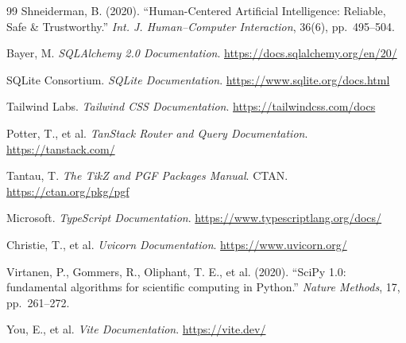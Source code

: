 \documentclass[11pt,a4paper]{article}
\begin{document}
{\begin{thebibliography}{99}
 Shneiderman, B. (2020). ``Human-Centered Artificial Intelligence: Reliable, Safe \& Trustworthy.'' \emph{Int. J. Human--Computer Interaction}, 36(6), pp.~495--504.

 Bayer, M. \emph{SQLAlchemy 2.0 Documentation}. \url{https://docs.sqlalchemy.org/en/20/}

 SQLite Consortium. \emph{SQLite Documentation}. \url{https://www.sqlite.org/docs.html}

 Tailwind Labs. \emph{Tailwind CSS Documentation}. \url{https://tailwindcss.com/docs}

 Potter, T., et al. \emph{TanStack Router and Query Documentation}. \url{https://tanstack.com/}

 Tantau, T. \emph{The TikZ and PGF Packages Manual}. CTAN. \url{https://ctan.org/pkg/pgf}

 Microsoft. \emph{TypeScript Documentation}. \url{https://www.typescriptlang.org/docs/}

 Christie, T., et al. \emph{Uvicorn Documentation}. \url{https://www.uvicorn.org/}

 Virtanen, P., Gommers, R., Oliphant, T. E., et al. (2020). ``SciPy 1.0: fundamental algorithms for scientific computing in Python.'' \emph{Nature Methods}, 17, pp.~261--272.

 You, E., et al. \emph{Vite Documentation}. \url{https://vite.dev/}

\end{thebibliography}
\let\section\qsfeoldsection}
\end{document}

